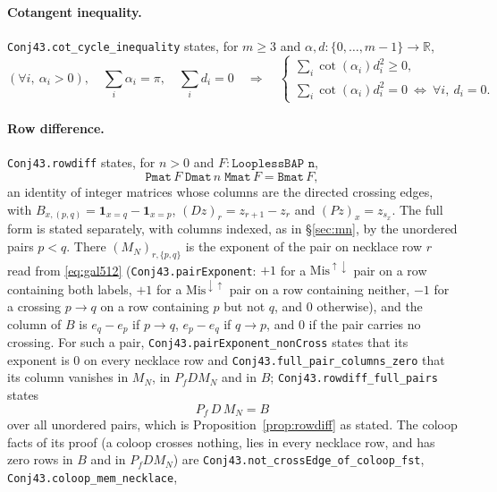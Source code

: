 \documentclass[11pt]{article}
\theoremstyle{definition}
\newcommand{\R}{\mathbb{R}}
\begin{document}
\paragraph{Cotangent inequality.}
\texttt{Conj43.\allowbreak cot\_\allowbreak cycle\_\allowbreak inequality} states, for $m\ge3$ and
$\alpha,d:\{0,\ldots,m-1\}\to\R$,
\[
 \left(\forall i,\ \alpha_i>0\right),\quad
 \sum_i\alpha_i=\pi,\quad\sum_i d_i=0
 \quad\Longrightarrow\quad
 \begin{cases}
  \sum_i\cot(\alpha_i)d_i^2\ge0,\\
  \sum_i\cot(\alpha_i)d_i^2=0\ \Longleftrightarrow\ \forall i,\ d_i=0.
 \end{cases}
\]

\paragraph{Row difference.}
\texttt{Conj43.\allowbreak rowdiff} states, for $n>0$ and $F:\texttt{LooplessBAP n}$,
\[
 \texttt{Pmat}\,F\;\texttt{Dmat}\,n\;\texttt{Mmat}\,F=\texttt{Bmat}\,F,
\]
an identity of integer matrices whose columns are the directed crossing edges, with
$B_{x,(p,q)}=\mathbf1_{x=q}-\mathbf1_{x=p}$, $(Dz)_r=z_{r+1}-z_r$ and $(Pz)_x=z_{s_x}$. The full form is
stated separately, with columns indexed, as in \S\ref{sec:mn}, by the unordered pairs $p<q$. There
$(M_N)_{r,\{p,q\}}$ is the exponent of the pair on necklace row $r$ read from \eqref{eq:gal512}
(\texttt{Conj43.\allowbreak pairExponent}: $+1$ for a $\mathrm{Mis}^{\uparrow\downarrow}$ pair on a row containing
both labels, $+1$ for a $\mathrm{Mis}^{\downarrow\uparrow}$ pair on a row containing neither, $-1$ for a
crossing $p\to q$ on a row containing $p$ but not $q$, and $0$ otherwise), and the column of $B$ is
$e_q-e_p$ if $p\to q$, $e_p-e_q$ if $q\to p$, and $0$ if the pair carries no crossing. For such a pair,
\texttt{Conj43.\allowbreak pairExponent\_\allowbreak nonCross} states that its exponent is $0$ on every necklace row and
\texttt{Conj43.\allowbreak full\_\allowbreak pair\_\allowbreak columns\_\allowbreak zero} that its column vanishes in $M_N$, in $P_fDM_N$ and in $B$;
\texttt{Conj43.\allowbreak rowdiff\_\allowbreak full\_\allowbreak pairs} states
\[
 P_f\,D\,M_N=B
\]
over all unordered pairs, which is Proposition~\ref{prop:rowdiff} as stated. The coloop facts of its
proof (a coloop crosses nothing, lies in every necklace row, and has zero rows in $B$ and in $P_fDM_N$)
are \texttt{Conj43.\allowbreak not\_\allowbreak crossEdge\_\allowbreak of\_\allowbreak coloop\_\allowbreak fst}, \texttt{Conj43.\allowbreak coloop\_\allowbreak mem\_\allowbreak necklace},
\end{document}
